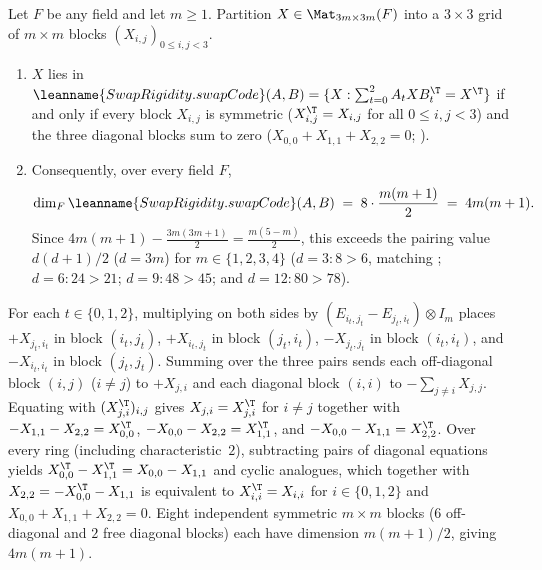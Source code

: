 \begin{theorem}[Dimension $4m(m+1)$ of the three-term block family on $d = 3m$]\label{thm:three-term-kronecker}
Let $F$ be any field and let $m \ge 1$. Partition $X \in \Mat_{3m\times 3m}(F)$ into a $3 \times 3$
grid of $m \times m$ blocks $(X_{i,j})_{0 \le i,j < 3}$.
\begin{enumerate}[label=(\alph*)]
\item $X$ lies in $\leanname{SwapRigidity.swapCode}(A, B) = \{X : \sum_{t=0}^2 A_t X B_t^{\T} = X^{\T}\}$
  if and only if every block $X_{i,j}$ is symmetric ($X_{i,j}^{\T} = X_{i,j}$ for all
  $0 \le i, j < 3$) and the three diagonal blocks sum to zero ($X_{0,0} + X_{1,1} + X_{2,2} = 0$;
  ).
\item Consequently, over every field $F$,
  \[
    \dim_F \leanname{SwapRigidity.swapCode}(A, B) \;=\; 8 \cdot \frac{m(m+1)}{2} \;=\; 4m(m+1).
  \]
  Since $4m(m+1) - \frac{3m(3m+1)}{2} = \frac{m(5 - m)}{2}$, this exceeds the pairing value
  $d(d+1)/2$ ($d = 3m$) for $m \in \{1, 2, 3, 4\}$ ($d = 3: 8 > 6$, matching
  \cite[Remark~5.6]{SeventeenthPaper2026}; $d = 6: 24 > 21$; $d = 9: 48 > 45$; and
  $d = 12: 80 > 78$).
\end{enumerate}
\end{theorem}
\begin{outline}
For each $t \in \{0,1,2\}$, multiplying on both sides by $(E_{i_t,j_t} - E_{j_t,i_t}) \otimes I_m$
places $+X_{j_t, i_t}$ in block $(i_t, j_t)$, $+X_{i_t, j_t}$ in block $(j_t, i_t)$, $-X_{j_t, j_t}$
in block $(i_t, i_t)$, and $-X_{i_t, i_t}$ in block $(j_t, j_t)$. Summing over the three pairs sends
each off-diagonal block $(i, j)$ ($i \ne j$) to $+X_{j,i}$ and each diagonal block $(i, i)$ to
$-\sum_{j \ne i} X_{j,j}$. Equating with $(X_{j,i}^{\T})_{i,j}$ gives $X_{j,i} = X_{j,i}^{\T}$ for
$i \ne j$ together with $-X_{1,1} - X_{2,2} = X_{0,0}^{\T}$, $-X_{0,0} - X_{2,2} = X_{1,1}^{\T}$,
and $-X_{0,0} - X_{1,1} = X_{2,2}^{\T}$. Over every ring (including characteristic~$2$), subtracting
pairs of diagonal equations yields $X_{0,0}^{\T} - X_{1,1}^{\T} = X_{0,0} - X_{1,1}$ and cyclic
analogues, which together with $X_{2,2} = -X_{0,0}^{\T} - X_{1,1}$ is equivalent to
$X_{i,i}^{\T} = X_{i,i}$ for $i \in \{0,1,2\}$ and $X_{0,0} + X_{1,1} + X_{2,2} = 0$. Eight
independent symmetric $m \times m$ blocks ($6$ off-diagonal and $2$ free diagonal blocks) each have
dimension $m(m+1)/2$, giving $4m(m+1)$.
\end{outline}

